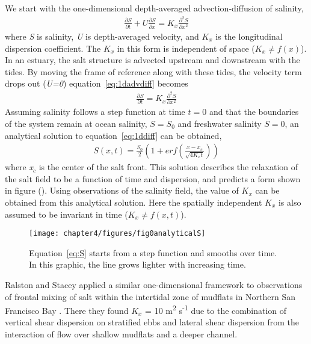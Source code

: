 We start with the one-dimensional depth-averaged advection-diffusion of salinity,
\begin{eqnarray}
\frac{\partial S}{\partial t} + U\frac{\partial S}{\partial x} = K_x\frac{\partial^2S}{\partial x^2} \label{eq:1dadvdiff}
\end{eqnarray}
where \emph{S} is salinity, \emph{U} is depth-averaged velocity, and $K_x$ is the longitudinal dispersion coefficient. The $K_x$ in this form is independent of space ($K_x\ne f(x)$).  In an estuary, the salt structure is advected upstream and downstream with the tides. By moving the frame of reference along with these tides, the velocity term drops out (\emph{U=0}) equation~\ref{eq:1dadvdiff} becomes
\begin{eqnarray}
\frac{\partial S}{\partial t} = K_x\frac{\partial^2S}{\partial x^2} \label{eq:1ddiff}
\end{eqnarray}
Assuming salinity follows a step function at time $t=0$ and that the boundaries of the system remain at ocean salinity, $S=S_0$ and freshwater salinity $S=0$, an analytical solution to equation~\ref{eq:1ddiff} can be obtained,
\begin{eqnarray}
S(x,t) = \frac{S_0}{2}\left(1+erf\left(\frac{x-x_c}{\sqrt{4K_xt}}\right)\right) \label{eq:S}
\end{eqnarray}
where \emph{x$_c$} is the center of the salt front. This solution describes the relaxation of the salt field to be a function of time and dispersion, and predicts a form shown in figure (). Using observations of the salinity field, the value of $K_x$ can be obtained from this analytical solution. Here the spatially independent $K_x$ is also assumed to be invariant in time ($K_x\ne f(x,t)$). 

\begin{figure}[h!]
\texttt{[image: chapter4/figures/fig0analyticalS]}
\caption{Equation~\ref{eq:S} starts from a step function and smooths over time. In this graphic, the line grows lighter with increasing time.} \label{fig:Sgraphic}
\end{figure}

Ralston and Stacey applied a similar one-dimensional framework to observations of frontal mixing of salt within the intertidal zone of mudflats in Northern San Francisco Bay \parencite*{Ralston:2005aa}. There they found $K_x$ = 10 m\textsuperscript{2} s\textsuperscript{-1} due to the combination of vertical shear dispersion on stratified ebbs and lateral shear dispersion from the interaction of flow over shallow mudflats and a deeper channel. 

